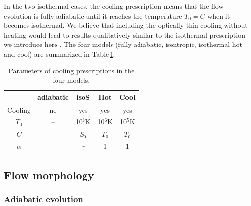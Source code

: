 \documentclass{aa}
\begin{document}
In the two isothermal cases, the cooling prescription means that the flow evolution is fully adiabatic until it reaches the temperature $T_0=C$ when it becomes isothermal. We believe that including the optically thin cooling without heating would lead to results qualitatively similar to the isothermal prescription we introduce here \citep[as noticed by][]{Saladino2018} . The four models (fully adiabatic, isentropic, isothermal hot and cool) are summarized in Table\,\ref{tab:cool}.

\begin{table}
\centering
\caption{Parameters of cooling prescriptions in the four models.}
\label{tab:cool}
\begin{tabularx}{0.78\columnwidth}{c|c|c|c|c}
   & adiabatic & isoS & Hot & Cool\\
  \hline
  Cooling & no & yes & yes & yes \\  
  $T_0$ & -- & 10$^6$K & 10$^6$K & 10$^5$K \\
  $C$ & -- & $S_0$ & $T_0$ & $T_0$ \\
  $\alpha$ & -- & $\gamma$ & 1 & 1 \\
\end{tabularx}
\end{table}

\subsection{Flow morphology}
\label{sec:morph}

\subsubsection{Adiabatic evolution}
\label{sec:cool_F}
\end{document}
